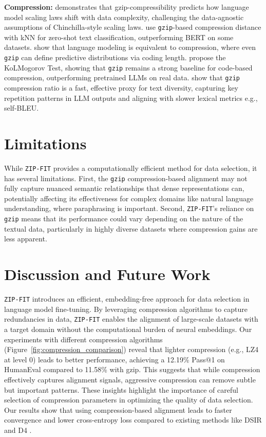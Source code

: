\textbf{Compression: }
\citet{pandey2024gzippredictsdatadependentscaling} demonstrates that gzip-compressibility predicts how language model scaling laws shift with data complexity, challenging the data-agnostic assumptions of Chinchilla-style scaling laws.
\citet{jiang2022gzip} use \texttt{gzip}-based compression distance with kNN for zero-shot text classification, outperforming BERT on some datasets.
\citet{languagemodelingcompression} show that language modeling is equivalent to compression, where even \texttt{gzip} can define predictive distributions via coding length.
\citet{yoran2025kolmogorovtestcompressioncode} propose the KoLMogorov Test, showing that \texttt{gzip} remains a strong baseline for code-based compression, outperforming pretrained LLMs on real data.
\citet{shaib2024standardizing} show that \texttt{gzip} compression ratio is a fast, effective proxy for text diversity, capturing key repetition patterns in LLM outputs and aligning with slower lexical metrics e.g., self-BLEU.

\section{Limitations}
While \texttt{ZIP-FIT} provides a computationally efficient method for data selection, it has several limitations. 
First, the \texttt{gzip} compression-based alignment may not fully capture nuanced semantic relationships that dense representations can, potentially affecting its effectiveness for complex domains like natural language understanding, where paraphrasing is important. 
Second, \texttt{ZIP-FIT}’s reliance on \texttt{gzip} means that its performance could vary depending on the nature of the textual data, particularly in highly diverse datasets where compression gains are less apparent. 



\section{Discussion and Future Work}

\texttt{ZIP-FIT} introduces an efficient, embedding-free approach for data selection in language model fine-tuning. 
By leveraging compression algorithms to capture redundancies in data, \texttt{ZIP-FIT} enables the alignment of large-scale datasets with a target domain without the computational burden of neural embeddings.
Our experiments with different compression algorithms (Figure~\ref{fig:compression_comparison}) reveal that lighter compression (e.g., LZ4 at level 0) leads to better performance, achieving a 12.19\% Pass@1 on HumanEval compared to 11.58\% with gzip. This suggests that while compression effectively captures alignment signals, aggressive compression can remove subtle but important patterns. These insights highlight the importance of careful selection of compression parameters in optimizing the quality of data selection.
Our results show that using compression-based alignment leads to faster convergence and lower cross-entropy loss compared to existing methods like DSIR and D4 \citep{d4, dsir}.

